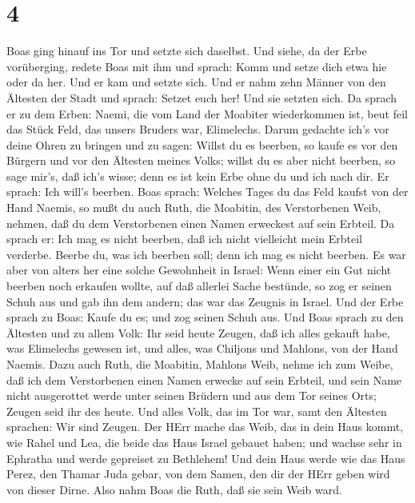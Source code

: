 \hypertarget{section-3}{%
\section{4}\label{section-3}}

 Boas ging hinauf ins Tor und setzte sich daselbst. Und
siehe, da der Erbe vorüberging, redete Boas mit ihm und sprach: Komm und
setze dich etwa hie oder da her. Und er kam und setzte sich.
 Und er nahm zehn Männer von den Ältesten der Stadt und
sprach: Setzet euch her! Und sie setzten sich.  Da sprach er
zu dem Erben: Naemi, die vom Land der Moabiter wiederkommen ist, beut
feil das Stück Feld, das unsers Bruders war, Elimelechs. 
Darum gedachte ich's vor deine Ohren zu bringen und zu sagen: Willst du
es beerben, so kaufe es vor den Bürgern und vor den Ältesten meines
Volks; willst du es aber nicht beerben, so sage mir's, daß ich's wisse;
denn es ist kein Erbe ohne du und ich nach dir. Er sprach: Ich will's
beerben.  Boas sprach: Welches Tages du das Feld kaufst von
der Hand Naemis, so mußt du auch Ruth, die Moabitin, des Verstorbenen
Weib, nehmen, daß du dem Verstorbenen einen Namen erweckest auf sein
Erbteil.  Da sprach er: Ich mag es nicht beerben, daß ich
nicht vielleicht mein Erbteil verderbe. Beerbe du, was ich beerben soll;
denn ich mag es nicht beerben.  Es war aber von alters her
eine solche Gewohnheit in Israel: Wenn einer ein Gut nicht beerben noch
erkaufen wollte, auf daß allerlei Sache bestünde, so zog er seinen Schuh
aus und gab ihn dem andern; das war das Zeugnis in Israel. 
Und der Erbe sprach zu Boas: Kaufe du es; und zog seinen Schuh aus.
 Und Boas sprach zu den Ältesten und zu allem Volk: Ihr seid
heute Zeugen, daß ich alles gekauft habe, was Elimelechs gewesen ist,
und alles, was Chiljons und Mahlons, von der Hand Naemis. 
Dazu auch Ruth, die Moabitin, Mahlons Weib, nehme ich zum Weibe, daß ich
dem Verstorbenen einen Namen erwecke auf sein Erbteil, und sein Name
nicht ausgerottet werde unter seinen Brüdern und aus dem Tor seines
Orts; Zeugen seid ihr des heute.  Und alles Volk, das im
Tor war, samt den Ältesten sprachen: Wir sind Zeugen. Der HErr mache das
Weib, das in dein Haus kommt, wie Rahel und Lea, die beide das Haus
Israel gebauet haben; und wachse sehr in Ephratha und werde gepreiset zu
Bethlehem!  Und dein Haus werde wie das Haus Perez, den
Thamar Juda gebar, von dem Samen, den dir der HErr geben wird von dieser
Dirne.  Also nahm Boas die Ruth, daß sie sein Weib ward.
